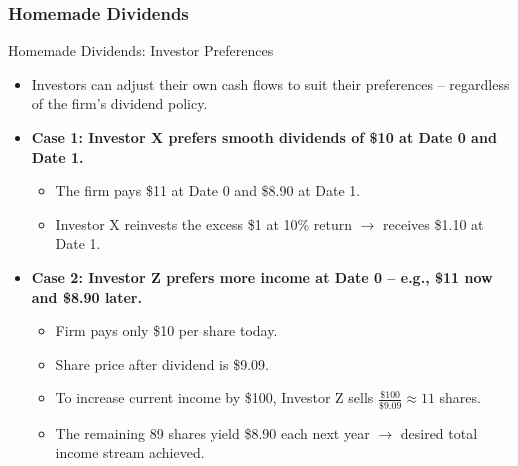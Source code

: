 \subsubsection{Homemade Dividends}
\begin{frame}{Homemade Dividends: Investor Preferences}

\begin{itemize}
    \item Investors can adjust their own cash flows to suit their preferences -- regardless of the firm's dividend policy.
    \vspace{3mm}
    
    \item \textbf{Case 1: Investor X prefers smooth dividends of \$10 at Date 0 and Date 1.}
    \begin{itemize}
        \item The firm pays \$11 at Date 0 and \$8.90 at Date 1.
        \item Investor X reinvests the excess \$1 at 10\% return $\rightarrow$ receives \$1.10 at Date 1.
    \end{itemize}
    
    \pause
    \item \textbf{Case 2: Investor Z prefers more income at Date 0 -- e.g., \$11 now and \$8.90 later.}
    \begin{itemize}
        \item Firm pays only \$10 per share today.
        \item Share price after dividend is \$9.09.
        \item To increase current income by \$100, Investor Z sells $\frac{\$100}{\$9.09} \approx 11$ shares.
        \item The remaining 89 shares yield \$8.90 each next year $\rightarrow$ desired total income stream achieved.
    \end{itemize}
\end{itemize}

\end{frame}

